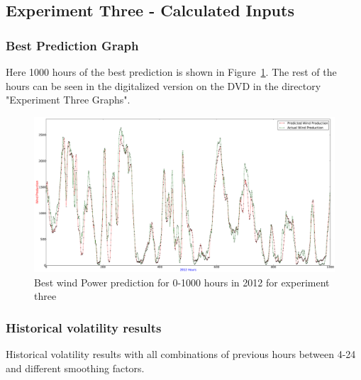 \subsection{Experiment Three - Calculated Inputs}

\subsubsection{Best Prediction Graph}
Here 1000 hours of the best prediction is shown in Figure~\ref{fig:experimentThreeInput}. The rest of the hours can be seen in the digitalized version on the DVD in the directory "Experiment Three Graphs".

\begin{figure}
\centering
\includegraphics[width=0.99\linewidth]{billeder/experimentThreeInput.png}
\caption{Best wind Power prediction for 0-1000 hours in 2012 for experiment three}
\label{fig:experimentThreeInput}
\end{figure} 
\newpage

\subsubsection{Historical volatility results}
\label{sec:historicalVolatiltiyResultsAppendix}
Historical volatility results with all combinations of previous hours between 4-24 and different smoothing factors.

